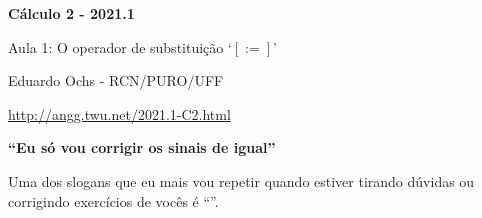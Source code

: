 \documentclass[oneside,12pt]{article}
\begin{document}
\def\Sthree{
  \iequationbox {\Intx{a}{b}{f(g(x))g'(x)}}
                {\Intu{g(a)}{g(b)}{f(u)}}
}
\def\SthreeI{
  \iequationbox {\intx{f(g(x))g'(x)}}
                {\intu{f(u)}
                 \qquad [u=g(x)]
                }
}

\def\Sthree{
  \pmat{
    \D \Intx{a}{b}{f(g(x))g'(x)} \\
    \veq \\
    \D \Intu{g(a)}{g(b)}{f(u)}
  }}

\def\SthreeI{
  \pmat{
    \D \intx{f(g(x))g'(x)} \\
       \veq \\
    \D \intu{f(u)} \\
    \text{Obs: $u=g(x)$.} \\
  }}



\def\Subst#1{\bmat{#1}}




%

\thispagestyle{empty}

\begin{center}

\vspace*{1.2cm}

{\bf \Large Cálculo 2 - 2021.1}

\bsk


Aula 1: O operador de substituição `$[:=]$'

\bsk

Eduardo Ochs - RCN/PURO/UFF

\url{http://angg.twu.net/2021.1-C2.html}

\end{center}

\newpage


{\bf ``Eu só vou corrigir os sinais de igual''}

Uma dos slogans que eu mais vou repetir quando estiver tirando dúvidas
ou corrigindo exercícios de vocês é ``''.
\end{document}
